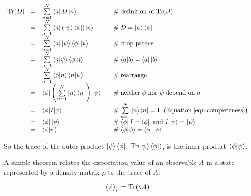 \documentclass[11pt, oneside]{article}   	%
\begin{document}
\begin{equation*}
\begin{array}{rcll}
\text{Tr}(D) 
&=& \sum\limits_{n = 1}^{N} \bra{n} D \ket{n}                                                          & \quad  \mathrel{\#} \text{definition of $\text{Tr}(D)$}  \\
&=& \sum\limits_{n = 1}^{N} \bra{n} (\ket{\psi} \bra{\phi})  \ket{n}                            & \quad  \mathrel{\#} D = \ket{\psi} \bra{\phi} \\
&=& \sum\limits_{n = 1}^{N} \bra{n} \ket{\psi} \bra{\phi}\ket{n}                                & \quad  \mathrel{\#} \text{drop parens} \\
&=& \sum\limits_{n = 1}^{N} \braket{n | \psi} \braket{\phi | n}                                  & \quad  \mathrel{\#} \braket{a | b} = \bra{a} \ket{b} \\
&=& \sum\limits_{n = 1}^{N} \braket{\phi | n} \braket{n | \psi}                                  & \quad  \mathrel{\#} \text{rearrange} \\
&=& \bra{\phi}  \Bigg (  \sum\limits_{n = 1}^{N}  \ket{n} \bra{n} \Bigg )  \ket{\psi}    & \quad  \mathrel{\#} \text{neither $\phi$ nor $\psi$ depend on $n$}\\
&=& \braket{\phi | I | \psi}                                                                                        & \quad  \mathrel{\#} \sum\limits_{n = 1}^{N} \ket{n} \bra{n} = \mathbf{I}  \;\;  \text{\big (Equation \ref{eqn:completeness}} \big ) \\
&=& \bra{\phi } \ket{\psi}                                                                                          & \quad  \mathrel{\#} \bra{\phi } I = \bra{\phi} \text{ and } I \ket{\psi}  = \ket{\psi}  \\
&=& \braket{\phi | \psi}                                                                                            & \quad  \mathrel{\#} \braket{\phi | \psi} = \bra{\phi} \ket{\psi}
\end{array}
\end{equation*}


\bigskip
\noindent
So the trace of the outer product  $\ket{\psi} \bra{\phi}$,  $\text{Tr}(\ket{\psi} \bra{\phi})$, is the inner product  $\braket{\phi | \psi}$.

\bigskip
\noindent
A simple theorem relates the expectation value of an observable $A$ in a state represented by a density matrix $\rho$ to the trace of $A$:

\begin{equation}
\braket{A}_\rho = \text{Tr}(\rho A)
\label{eqn:braket_A}
\end{equation}
\end{document}

